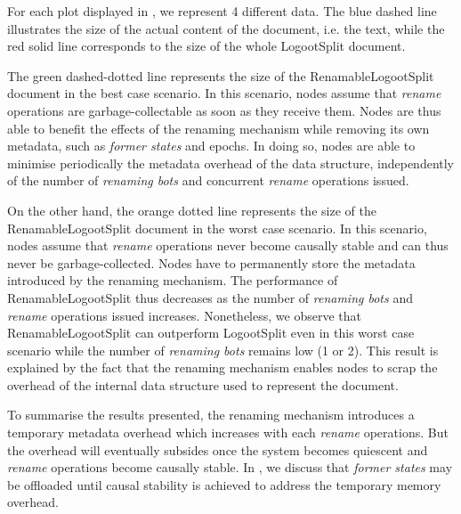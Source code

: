 \documentclass[10pt,journal,compsoc]{IEEEtran}
\newcommand{\ie}{i.e. }
\begin{document}
For each plot displayed in , we represent 4 different data.
The blue dashed line illustrates the size of the actual content of the document, \ie the text, while the red solid line corresponds to the size of the whole LogootSplit document.

The green dashed-dotted line represents the size of the RenamableLogootSplit document in the best case scenario.
In this scenario, nodes assume that \emph{rename} operations are garbage-collectable as soon as they receive them.
Nodes are thus able to benefit the effects of the renaming mechanism while removing its own metadata, such as \emph{former states} and epochs.
In doing so, nodes are able to minimise periodically the metadata overhead of the data structure, independently of the number of \emph{renaming bots} and concurrent \emph{rename} operations issued.

On the other hand, the orange dotted line represents the size of the RenamableLogootSplit document in the worst case scenario.
In this scenario, nodes assume that \emph{rename} operations never become causally stable and can thus never be garbage-collected.
Nodes have to permanently store the metadata introduced by the renaming mechanism.
The performance of RenamableLogootSplit thus decreases as the number of \emph{renaming bots} and \emph{rename} operations issued increases.
Nonetheless, we observe that RenamableLogootSplit can outperform LogootSplit even in this worst case scenario while the number of \emph{renaming bots} remains low (1 or 2).
This result is explained by the fact that the renaming mechanism enables nodes to scrap the overhead of the internal data structure used to represent the document.

To summarise the results presented, the renaming mechanism introduces a temporary metadata overhead which increases with each \emph{rename} operations.
But the overhead will eventually subsides once the system becomes quiescent and \emph{rename} operations become causally stable.
In , we discuss that \emph{former states} may be offloaded until causal stability is achieved to address the temporary memory overhead.
\end{document}
